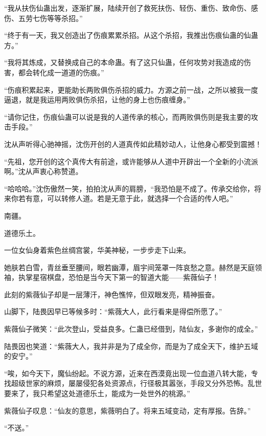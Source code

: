 \begin{this_body}
“我从扶伤仙蛊出发，逐渐扩展，陆续开创了救死扶伤、轻伤、重伤、致命伤、感伤、五劳七伤等等杀招。”

“终于有一天，我又创造出了伤痕累累杀招。从这个杀招，我推出伤痕仙蛊的仙蛊方。”

“我将其炼成，又替换成自己的本命蛊。有了这只仙蛊，任何攻势对我造成的伤害，都会转化成一道道的伤痕。”

“伤痕积累起来，更能助长两败俱伤杀招的威力。方源之前一战，之所以被我一度逼退，就是我运用两败俱伤杀招，让他的身上也伤痕缠身。”

“请你记住，伤痕仙蛊可以说是我的人道传承的核心，而两败俱伤则是我主要的攻击手段。”

沈从声听得心驰神摇，沈伤开创的人道真传如此精妙动人，让他身心都受到震撼！

“先祖，您开创的这个真传大有前途，或许能够从人道中开辟出一个全新的小流派啊。”沈从声衷心称赞道。

“哈哈哈。”沈伤傲然一笑，拍拍沈从声的肩膀，“我恐怕是不成了。传承交给你，将来你若有意，可以转修人道。若是无意于此，就选择一个合适的传人吧。”

南疆。

道德乐土。

一位女仙身着紫色丝绸宫裳，华美神秘，一步步走下山来。

她肤若白雪，青丝垂至腰间，眼若幽潭，眉宇间笼罩一阵哀愁之意。赫然是天庭领袖，执掌星宿棋盘，恐怕是当今天下第一的智道大能——紫薇仙子！

此刻的紫薇仙子却是一层薄汗，神色憔悴，但双眼发亮，精神振奋。

山脚下，陆畏因早已等候多时：“紫薇大人，此行看来是得偿所愿了。”

紫薇仙子微笑：“此次登山，受益良多。仁蛊已经借到，陆仙友，多谢你的成全。”

陆畏因也笑道：“紫薇大人，我并非是为了成全你，而是为了成全天下，维护五域的安宁。”

“唉，如今天下，魔仙纷起。不说方源，近来在西漠竟出现一位血道八转大能，专找超级世家的麻烦，屡屡侵犯各处资源点，行径极其嚣张，手段又分外恐怖。乱世要来了，我只希望这处道德乐土，能成为一处世外的桃源。”

紫薇仙子叹息：“仙友的意思，紫薇明白了。将来五域变动，定有厚报。告辞。”

“不送。”

\end{this_body}

